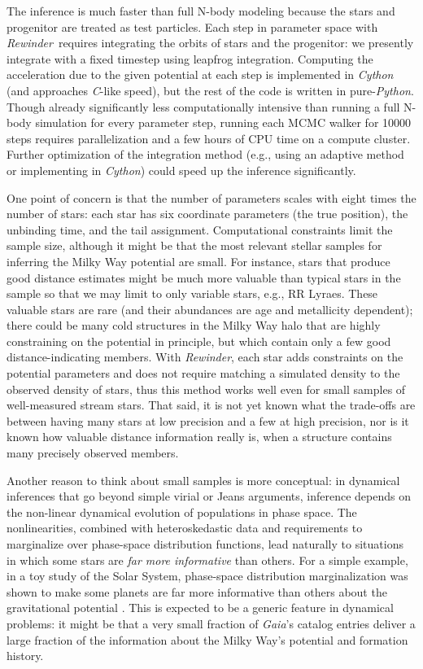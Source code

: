 \documentclass[letterpaper,12pt,preprint]{aastex}
\newcommand{\project}[1]{\textsl{#1}}
\newcommand{\gaia}{\project{Gaia}}
\newcommand{\rewinder}{\emph{Rewinder}}
\begin{document}
The inference is much faster than full N-body modeling because the stars and progenitor are treated as test particles. Each step in parameter space with \rewinder\ requires integrating the orbits of stars and the progenitor: we presently integrate with a fixed timestep using leapfrog integration. Computing the acceleration due to the given potential at each step is implemented in \project{Cython} (and approaches \project{C}-like speed), but the rest of the code is written in pure-\project{Python}. Though already significantly less computationally intensive than running a full N-body simulation for every parameter step, running each MCMC walker for 10000 steps requires parallelization and a few hours of CPU time on a compute cluster. Further optimization of the integration method (e.g., using an adaptive method or implementing in \project{Cython}) could speed up the inference significantly. 

One point of concern is that the number of parameters scales with eight times the number of stars: each star has six coordinate parameters (the true position), the unbinding time, and the tail assignment. Computational constraints limit the sample size, although it might be that the most relevant stellar samples for inferring the Milky Way potential are small. For instance, stars that produce good distance estimates might be much more valuable than typical stars in the sample so that we may limit to only variable stars, e.g., RR Lyraes. These valuable stars are rare (and their abundances are age and metallicity dependent); there could be many cold structures in the Milky Way halo that are highly constraining on the potential in principle, but which contain only a few good distance-indicating members. With \rewinder, each star adds constraints on the potential parameters and does not require matching a simulated density to the observed density of stars, thus this method works well even for small samples of well-measured stream stars. That said, it is not yet known what the trade-offs are between having many stars at low precision and a few at high precision, nor is it known how valuable distance information really is, when a structure contains many precisely observed members. 

Another reason to think about small samples is more conceptual:
in dynamical inferences that go beyond simple virial or Jeans arguments,
  inference depends on the non-linear dynamical evolution of populations in phase space.
The nonlinearities, 
  combined with heteroskedastic data and requirements to marginalize over phase-space distribution functions,
  lead naturally to situations in which some stars are \emph{far more informative} than others.
For a simple example, in a toy study of the Solar System,
  phase-space distribution marginalization was shown to make some planets are far more informative than others
  about the gravitational potential \citep{bovy10}.
This is expected to be a generic feature in dynamical problems:
  it might be that a very small fraction of \gaia's catalog entries
  deliver a large fraction of the information about the Milky Way's potential and formation history.
\end{document}
